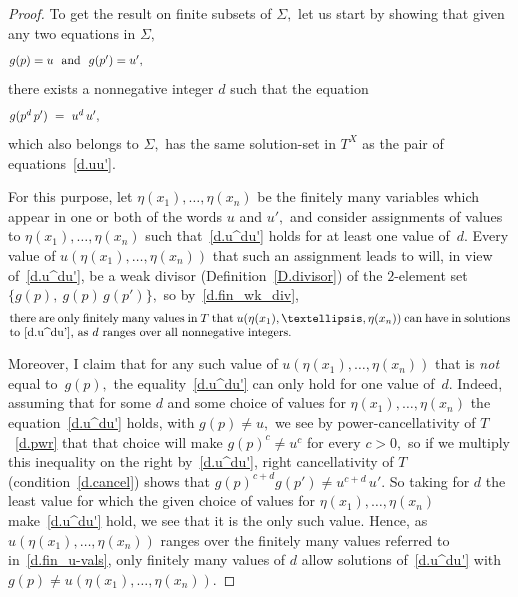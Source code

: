 \documentclass[10pt,a4paper]{amsart}
\begin{document}
\begin{proof}
To get the result on finite subsets of $\Sigma,$
let us start by showing that given any two equations in $\Sigma,$
%
\begin{equation}\begin{minipage}[c]{35pc}\label{d.uu'}
$g(p)=u$ \ and \ $g(p')=u',$
\end{minipage}\end{equation}
%
there exists a nonnegative integer $d$ such that the equation
%
\begin{equation}\begin{minipage}[c]{35pc}\label{d.u^du'}
$g(p^d\,p')\ =\ u^d\,u',$
\end{minipage}\end{equation}
%
which also belongs to $\Sigma,$ has the same solution-set
in $T^X$ as the pair of equations~\eqref{d.uu'}.

For this purpose, let $\eta(x_1),\dots,\eta(x_n)$ be the finitely many
variables which appear in one or both of the words
$u$ and $u',$ and consider
assignments of values to $\eta(x_1),\dots,\eta(x_n)$ such
that~\eqref{d.u^du'} holds for at least one value of~$d.$
Every value of $u(\eta(x_1),\dots,\eta(x_n))$
that such an assignment leads to will, in view of~\eqref{d.u^du'},
be a weak divisor (Definition~\ref{D.divisor})
of the $\!2\!$-element set $\{g(p),\ g(p)\,g(p')\},$
so by~\eqref{d.fin_wk_div},
%
\begin{equation}\begin{minipage}[c]{35pc}\label{d.fin_u-vals}
there are only finitely many values in $T$ that
$u(\eta(x_1),\dots,\eta(x_n))$ can have in solutions
to~\eqref{d.u^du'}, as $d$ ranges over all nonnegative integers.
\end{minipage}\end{equation}

Moreover, I claim that for any such value of
$u(\eta(x_1),\dots,\eta(x_n))$ that is
{\em not} equal to~$g(p),$ the equality~\eqref{d.u^du'} can only
hold for one value of~$d.$
Indeed, assuming that for some $d$ and some
choice of values for $\eta(x_1),\dots,\eta(x_n)$
the equation~\eqref{d.u^du'}
holds, with $g(p)\neq u,$ we see by power-cancellativity
of $T$~\eqref{d.pwr} that %
that choice will make $g(p)^c\neq u^c$ for every $c>0,$ so
if we multiply this inequality on the right by~\eqref{d.u^du'},
right cancellativity of $T$ (condition~\eqref{d.cancel}) shows
that $g(p)^{c+d}g(p')\neq u^{c+d}\,u'.$
So taking for $d$ the least value for which the given
choice of values for $\eta(x_1),\dots,\eta(x_n)$
make~\eqref{d.u^du'} hold, we see that it is the only such value.
Hence, as $u(\eta(x_1),\dots,\eta(x_n))$ ranges over the
finitely many values referred to
in~\eqref{d.fin_u-vals}, only finitely many values of $d$
allow solutions of~\eqref{d.u^du'} with
$g(p)\neq u(\eta(x_1),\dots,\eta(x_n)).$


\end{proof}
\end{document}
